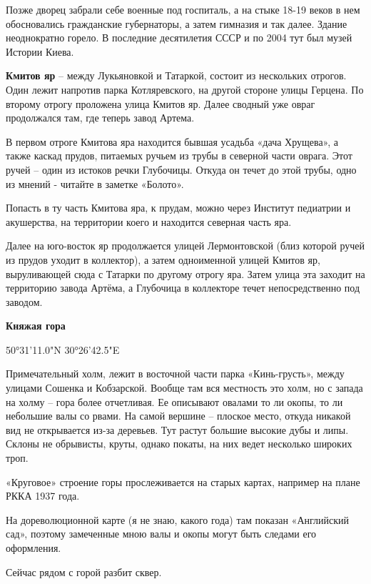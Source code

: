 Позже дворец забрали себе военные под госпиталь, а на стыке 18-19 веков в нем обосновались гражданские губернаторы, а затем гимназия и так далее. Здание неоднократно горело. В последние десятилетия СССР и по 2004 тут был музей Истории Киева.\\

\medskip


\textbf{Кмитов яр} – между Лукьяновкой и Татаркой, состоит из нескольких отрогов. Один 
лежит напротив парка Котляревского, на другой стороне улицы Герцена. По второму отрогу проложена улица Кмитов яр. Далее сводный уже овраг продолжался там, где теперь завод Артема.

В первом отроге Кмитова яра находится бывшая усадьба «дача Хрущева», а также каскад прудов, питаемых ручьем из трубы в северной части оврага. Этот ручей – один из истоков речки Глубочицы. Откуда он течет до этой трубы, одно из мнений - читайте в заметке «Болото». 

Попасть в ту часть Кмитова яра, к прудам, можно через Институт педиатрии и акушерства, на территории коего и находится северная часть яра.

Далее на юго-восток яр продолжается улицей Лермонтовской (близ которой ручей из прудов уходит в коллектор), а затем одноименной улицей Кмитов яр, выруливающей сюда с Татарки по другому отрогу яра. Затем улица эта заходит на территорию завода Артёма, а Глубочица в коллекторе течет непосредственно под заводом.\\

\medskip


\textbf{Княжая гора} 

50°31'11.0"N 30°26'42.5"E

Примечательный холм, лежит в восточной части парка «Кинь-грусть», между улицами Сошенка и Кобзарской. Вообще там вся местность это холм, но с запада на холму – гора более отчетливая. Ее описывают овалами то ли окопы, то ли небольшие валы со рвами. На самой вершине – плоское место, откуда никакой вид не открывается из-за деревьев. Тут растут большие высокие дубы и липы. Склоны не обрывисты, круты, однако покаты, на них ведет несколько широких троп. 

«Круговое» строение горы прослеживается на старых картах, например на плане РККА 1937 года.

На дореволюционной карте (я не знаю, какого года) там показан «Английский сад», поэтому замеченные мною валы и окопы могут быть следами его оформления.

Сейчас рядом с горой разбит сквер.\\

